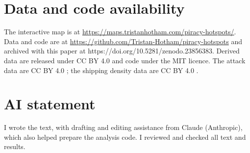 \documentclass[11pt,a4paper]{article}
\begin{document}
\section*{Data and code availability}
The interactive map is at \url{https://maps.tristanhotham.com/piracy-hotspots/}. Data and code are at \url{https://github.com/Tristan-Hotham/piracy-hotspots} and archived with this paper at https://doi.org/10.5281/zenodo.23856383. Derived data are released under CC BY 4.0 and code under the MIT licence. The attack data are CC BY 4.0 \citep{benden}; the shipping density data are CC BY 4.0 \citep{wbships}.

\section*{AI statement}
I wrote the text, with drafting and editing assistance from Claude (Anthropic), which also helped prepare the analysis code. I reviewed and checked all text and results.
\end{document}
